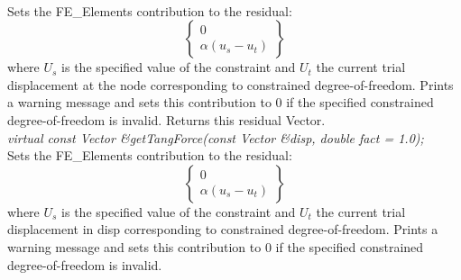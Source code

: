  \\
Sets the FE\_Elements contribution to the residual:
\[ \left\{ \begin{array}{c} 0 \\ \alpha(u_s - u_t) \end{array} \right\} \]
where $U_s$ is the specified value of the
constraint and $U_t$ the current trial displacement at the node
corresponding to constrained degree-of-freedom. Prints a warning
message and sets this contribution to $0$ if the specified constrained
degree-of-freedom is invalid. Returns this residual Vector.\\


{\em virtual const Vector \&getTangForce(const Vector \&disp, double
fact = 1.0);    }\\
Sets the FE\_Elements contribution to the residual:
\[ \left\{ \begin{array}{c} 0 \\ \alpha(u_s - u_t) \end{array} \right\} \]
where $U_s$ is the specified value of the
constraint and $U_t$ the current trial displacement in \p disp
corresponding to constrained degree-of-freedom. Prints a warning
message and sets this contribution to $0$ if the specified constrained
degree-of-freedom is invalid. \\ 










